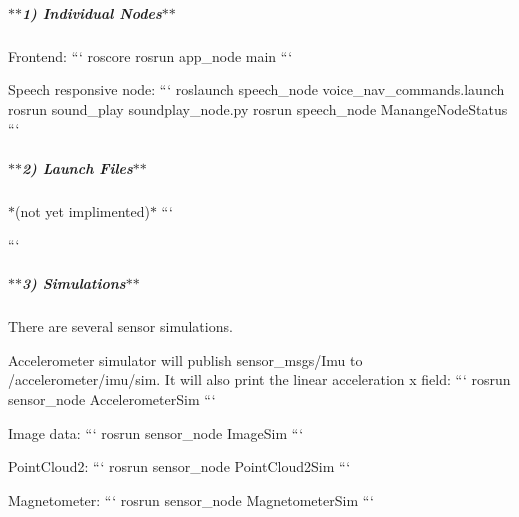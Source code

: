 \subparagraph*{$\ast$$\ast$1) Individual Nodes$\ast$$\ast$}

Frontend\-: ``` roscore rosrun app\-\_\-node main ```

Speech responsive node\-: ``` roslaunch speech\-\_\-node voice\-\_\-nav\-\_\-commands.\-launch rosrun sound\-\_\-play soundplay\-\_\-node.\-py rosrun speech\-\_\-node Manange\-Node\-Status ```

\subparagraph*{$\ast$$\ast$2) Launch Files$\ast$$\ast$}

$\ast$(not yet implimented)$\ast$ ```

```

\subparagraph*{$\ast$$\ast$3) Simulations$\ast$$\ast$}

There are several sensor simulations.

Accelerometer simulator will publish {\ttfamily sensor\-\_\-msgs/\-Imu} to {\ttfamily /accelerometer/imu/sim}. It will also print the linear acceleration x field\-: ``` rosrun sensor\-\_\-node Accelerometer\-Sim ```

Image data\-: ``` rosrun sensor\-\_\-node Image\-Sim ```

Point\-Cloud2\-: ``` rosrun sensor\-\_\-node Point\-Cloud2\-Sim ```

Magnetometer\-: ``` rosrun sensor\-\_\-node Magnetometer\-Sim ``` 